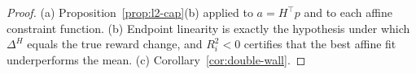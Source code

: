 \documentclass[12pt,a4paper]{report}
\newcommand{\1}{\mathbf{1}}
\theoremstyle{definition}
\begin{document}
\begin{proof}
(a) Proposition~\ref{prop:l2-cap}(b) applied to \(a=H^\top p\) and to each affine constraint function. (b) Endpoint linearity is exactly the hypothesis under which \(\Delta^H\) equals the true reward change, and \(R^2_i<0\) certifies that the best affine fit underperforms the mean. (c) Corollary~\ref{cor:double-wall}.
\end{proof}



\end{document}
